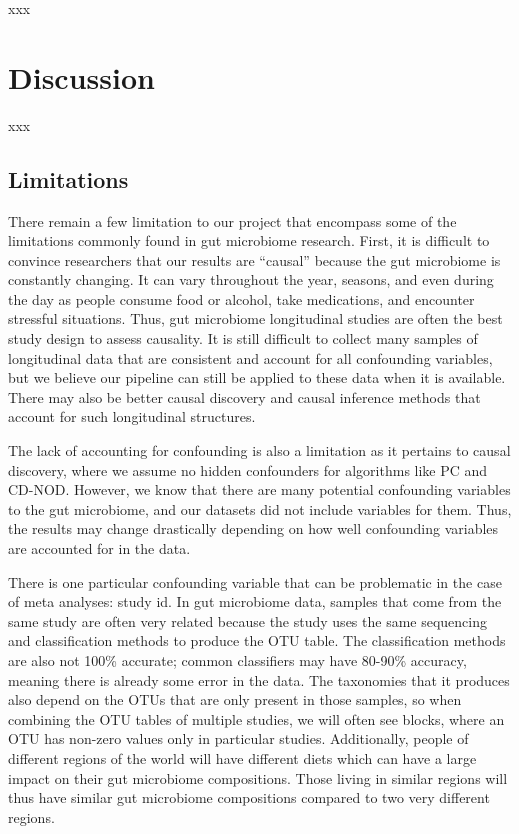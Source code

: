 \documentclass[12pt,letterpaper]{article}
\begin{document}
xxx

\section{Discussion}

xxx

\subsection{Limitations}

There remain a few limitation to our project that encompass some of the limitations commonly found in gut microbiome research. First, it is difficult to convince researchers that our results are “causal” because the gut microbiome is constantly changing. It can vary throughout the year, seasons, and even during the day as people consume food or alcohol, take medications, and encounter stressful situations. Thus, gut microbiome longitudinal studies are often the best study design to assess causality. It is still difficult to collect many samples of longitudinal data that are consistent and account for all confounding variables, but we believe our pipeline can still be applied to these data when it is available. There may also be better causal discovery and causal inference methods that account for such longitudinal structures. 

The lack of accounting for confounding is also a limitation as it pertains to causal discovery, where we assume no hidden confounders for algorithms like PC and CD-NOD. However, we know that there are many potential confounding variables to the gut microbiome, and our datasets did not include variables for them. Thus, the results may change drastically depending on how well confounding variables are accounted for in the data. 

There is one particular confounding variable that can be problematic in the case of meta analyses: study id. In gut microbiome data, samples that come from the same study are often very related because the study uses the same sequencing and classification methods to produce the OTU table. The classification methods are also not 100\% accurate; common classifiers may have 80-90\% accuracy, meaning there is already some error in the data. The taxonomies that it produces also depend on the OTUs that are only present in those samples, so when combining the OTU tables of multiple studies, we will often see blocks, where an OTU has non-zero values only in particular studies. Additionally, people of different regions of the world will have different diets which can have a large impact on their gut microbiome compositions. Those living in similar regions will thus have similar gut microbiome compositions compared to two very different regions. 
\end{document}
